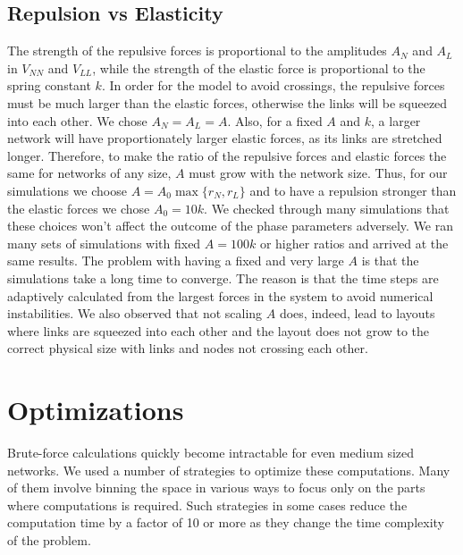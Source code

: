 \documentclass[nofootinbib,preprint,floatfix,titlepage,superscriptaddress]{revtex4} %
\newcommand{\outNim}[1]{}
\begin{document}
\outNim{
\subsection{FDL bad}
Even with a reasonably small link thickness, the plain FDL puts nodes too close to each other and makes linking them very cumbersome. Of course, modern algorithms based on FDL modify it in order to avoid such node crossings. 
Our E-ELM algorithm with purely short-range forces between nodes naturally includes the exclusion volume around nodes and avoids nodes overlaps. 
}

\subsection{Repulsion vs Elasticity}
The strength of the repulsive forces is proportional to the amplitudes $A_N$ and $A_L$ in $V_{NN}$ and $V_{LL}$, while the  strength of the elastic force is proportional to the spring constant $k$. 
In order for the model to avoid crossings, the repulsive forces must be  much larger than the elastic forces, otherwise the links will be squeezed into each other. 
We chose $A_N=A_L = A$.
Also, for a fixed $A$ and $k$, a larger network will have proportionately larger elastic forces, as its links are stretched longer. 
Therefore, to make the ratio of the repulsive forces and elastic forces the same for networks of any size, $A$ must grow with the network size. 
Thus, for our simulations we choose $A = A_0 \max\{r_N, r_L\}$ and to have a repulsion stronger than the elastic forces we chose $A_0 = 10 k$. 
We checked through many simulations that these choices won't affect the outcome of the phase parameters adversely. 
We ran many sets of simulations with fixed $A = 100k $ or higher ratios and arrived at the same results. 
The problem with having a fixed and very large $A$ is that the simulations take a long time to converge. 
The reason is that the time steps are adaptively calculated from the largest forces in the system to avoid numerical instabilities. 
We also observed that not scaling $A$ does, indeed, lead to layouts where links are squeezed into each other and the layout does not grow to the correct physical size with links and nodes not crossing each other.  

\section{Optimizations}
Brute-force calculations quickly become intractable for even medium sized networks. We used a number of strategies to optimize these computations. Many of them involve binning the space in various ways to focus only on the parts where computations is required. Such strategies in some cases reduce the computation time by a factor of 10 or more as they change the time complexity of the problem. 
\end{document}
